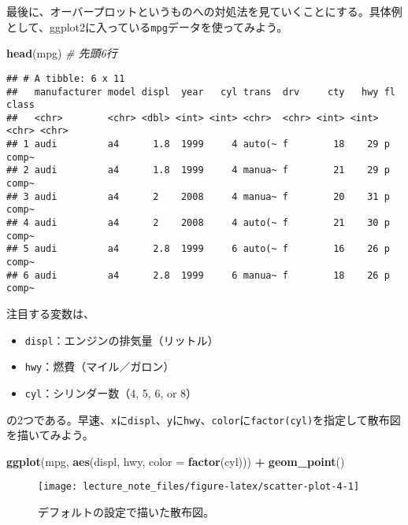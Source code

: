 \documentclass[]{book}
\newenvironment{Shaded}{\begin{snugshade}}{\end{snugshade}}
\newcommand{\KeywordTok}[1]{\textcolor[rgb]{0.13,0.29,0.53}{\textbf{#1}}}
\newcommand{\DataTypeTok}[1]{\textcolor[rgb]{0.13,0.29,0.53}{#1}}
\newcommand{\StringTok}[1]{\textcolor[rgb]{0.31,0.60,0.02}{#1}}
\newcommand{\CommentTok}[1]{\textcolor[rgb]{0.56,0.35,0.01}{\textit{#1}}}
\newcommand{\OperatorTok}[1]{\textcolor[rgb]{0.81,0.36,0.00}{\textbf{#1}}}
\newcommand{\NormalTok}[1]{#1}
\begin{document}
最後に、オーバープロットというものへの対処法を見ていくことにする。具体例として、ggplot2に入っている\texttt{mpg}データを使ってみよう。

\begin{Shaded}
\begin{Highlighting}[]
\KeywordTok{head}\NormalTok{(mpg) }\CommentTok{# 先頭6行}
\end{Highlighting}
\end{Shaded}

\begin{verbatim}
## # A tibble: 6 x 11
##   manufacturer model displ  year   cyl trans  drv     cty   hwy fl    class
##   <chr>        <chr> <dbl> <int> <int> <chr>  <chr> <int> <int> <chr> <chr>
## 1 audi         a4      1.8  1999     4 auto(~ f        18    29 p     comp~
## 2 audi         a4      1.8  1999     4 manua~ f        21    29 p     comp~
## 3 audi         a4      2    2008     4 manua~ f        20    31 p     comp~
## 4 audi         a4      2    2008     4 auto(~ f        21    30 p     comp~
## 5 audi         a4      2.8  1999     6 auto(~ f        16    26 p     comp~
## 6 audi         a4      2.8  1999     6 manua~ f        18    26 p     comp~
\end{verbatim}

注目する変数は、

\begin{itemize}
\item
  \texttt{displ}：エンジンの排気量（リットル）
\item
  \texttt{hwy}：燃費（マイル／ガロン）
\item
  \texttt{cyl}：シリンダー数（4, 5, 6, or 8）
\end{itemize}

の2つである。早速、\texttt{x}に\texttt{displ}、\texttt{y}に\texttt{hwy}、\texttt{color}に\texttt{factor(cyl)}を指定して散布図を描いてみよう。



\begin{Shaded}
\begin{Highlighting}[]
\KeywordTok{ggplot}\NormalTok{(mpg, }\KeywordTok{aes}\NormalTok{(displ, hwy, }\DataTypeTok{color =} \KeywordTok{factor}\NormalTok{(cyl))) }\OperatorTok{+}
\StringTok{  }\KeywordTok{geom_point}\NormalTok{()}
\end{Highlighting}
\end{Shaded}

\begin{figure}

{\centering \texttt{[image: lecture\_note\_files/figure-latex/scatter-plot-4-1]} 

}

\caption{デフォルトの設定で描いた散布図。}\label{fig:scatter-plot-4}
\end{figure}
\end{document}
